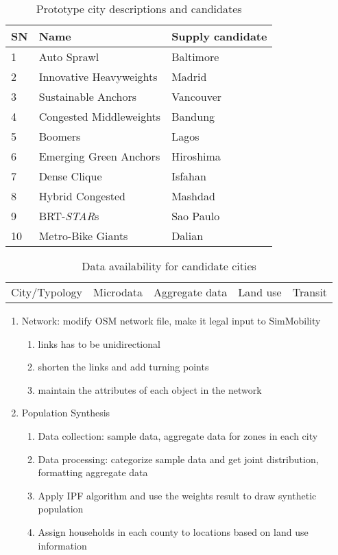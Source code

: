 \documentclass[11pt,twoside]{article}
\numberwithin{equation}{section}
\newcommand{\?}{\stackrel{?}{=}}
\begin{document}
\begin{table}[h!]
  \centering
  \begin{tabular}{l l l}\toprule
    \bf SN &\bf Name &\bf Supply candidate \\\midrule
    1 & Auto Sprawl & Baltimore \\
    2 & Innovative Heavyweights & Madrid \\
    3 & Sustainable Anchors & Vancouver \\
    4 & Congested Middleweights & Bandung \\
    5 & Boomers & Lagos \\
    6 & Emerging Green Anchors & Hiroshima \\
    7 & Dense Clique & Isfahan\\
    8 & Hybrid Congested & Mashdad \\
    9 & BRT-{\it STAR}s & Sao Paulo  \\
    10 & Metro-Bike Giants & Dalian \\ \bottomrule
  \end{tabular}
  \caption{Prototype city descriptions and candidates}
  \label{tab:proto}
\end{table}


\begin{table}[h!]
  \centering
  \begin{tabular}{l l l l l }
    City/Typology & Microdata & Aggregate data & Land use & Transit \\
  \end{tabular}
  \caption{Data availability for candidate cities}
  \label{tab:avail}
\end{table}


\begin{enumerate}[Step 1:]
\item Network: modify OSM network file, make it legal input to SimMobility
  \begin{enumerate}[1.]
  \item links has to be unidirectional
  \item shorten the links and add turning points
  \item maintain the attributes of each object in the network
  \end{enumerate}
\item Population Synthesis
  \begin{enumerate}[1.]
  \item Data collection: sample data, aggregate data for zones in each city
  \item Data processing: categorize sample data and get joint distribution, formatting aggregate data
  \item Apply IPF algorithm and use the weights result to draw synthetic population
  \item Assign households in each county to locations based on land use information
  \end{enumerate} 
\end{enumerate}
\end{document}
